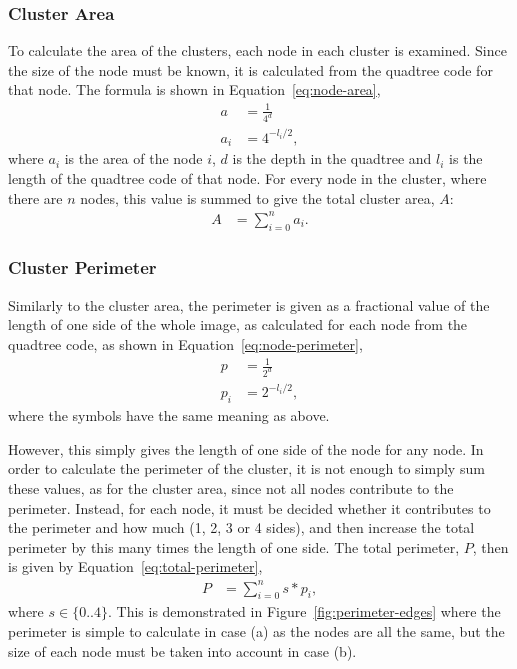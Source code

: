 \subsubsection{Cluster Area}
\label{ssub:cluster_area}

To calculate the area of the clusters, each node in each cluster is examined.
Since the size of the node must be known, it is calculated from the quadtree
code for that node. The formula is shown in Equation~\ref{eq:node-area},
\begin{align}
	a &= \frac{1}{4^{d}} \\
	a_i &= 4^{-l_i/2}, \label{eq:node-area}
\end{align}
where $a_i$ is the area of the node $i$, $d$ is the depth in the quadtree and
$l_i$ is the length of the quadtree code of that node. For every node in the
cluster, where there are $n$ nodes, this value is summed to give the total
cluster area, $A$:
\begin{align}
	A &= \sum_{i=0}^{n} a_i.
\end{align}

\subsubsection{Cluster Perimeter}
\label{ssub:cluster_perimeter}

Similarly to the cluster area, the perimeter is given as a fractional value of
the length of one side of the whole image, as calculated for each node from the
quadtree code, as shown in Equation~\ref{eq:node-perimeter},
\begin{align}
	p &= \frac{1}{2^{d}} \\
	p_i &= 2^{-l_i/2}, \label{eq:node-perimeter}
\end{align}
where the symbols have the same meaning as above.

However, this simply gives the length of one side of the node for any node. In
order to calculate the perimeter of the cluster, it is not enough to simply
sum these values, as for the cluster area, since not all nodes contribute to
the perimeter. Instead, for each node, it must be decided whether it
contributes to the perimeter and how much (1, 2, 3 or 4 sides), and then
increase the total perimeter by this many times the length of one side. The
total perimeter, $P$, then is given by Equation~\ref{eq:total-perimeter},
\begin{align}
	P &= \sum_{i=0}^{n} s * p_i, \label{eq:total-perimeter}
\end{align}
where $s \in \{0..4\}$. This is demonstrated in
Figure~\ref{fig:perimeter-edges} where the perimeter is simple to calculate in
case (a) as the nodes are all the same, but the size of each node must be taken
into account in case (b).

